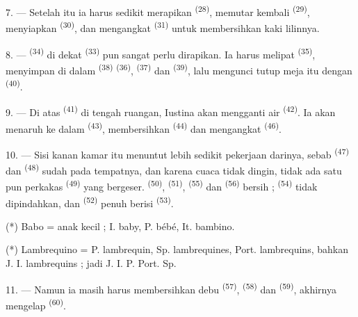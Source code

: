 7. --- Setelah itu ia harus sedikit merapikan 
\textsuperscript{(28)}, memutar kembali 
\textsuperscript{(29)}, menyiapkan 
\textsuperscript{(30)}, dan mengangkat 
\textsuperscript{(31)} untuk membersihkan kaki lilinnya.

\VUsaut{5.0mm}
\VUsaut{3.0mm}

8. ---  \textsuperscript{(34)} di dekat
 \textsuperscript{(33)} pun sangat perlu
dirapikan. Ia harus melipat 
\textsuperscript{(35)}, menyimpan di dalam 
\textsuperscript{(38)}  
\textsuperscript{(36)},  \textsuperscript{(37)} dan
 \textsuperscript{(39)}, lalu mengunci tutup meja itu
dengan  \textsuperscript{(40)}.

9. --- Di atas  \textsuperscript{(41)} di
tengah ruangan, Iustina akan mengganti air 
\textsuperscript{(42)}. Ia akan menaruh  ke dalam
 \textsuperscript{(43)}, membersihkan
 \textsuperscript{(44)} dan mengangkat
 \textsuperscript{(46)}.

10. --- Sisi kanan kamar itu menuntut lebih sedikit pekerjaan
darinya, sebab  \textsuperscript{(47)} dan
 \textsuperscript{(48)} sudah pada tempatnya, dan
karena cuaca tidak dingin, tidak ada satu pun perkakas
 \textsuperscript{(49)} yang bergeser.
 \textsuperscript{(50)}, 
\textsuperscript{(51)},  \textsuperscript{(55)}
dan  \textsuperscript{(56)} bersih ;  \textsuperscript{(54)} tidak dipindahkan, dan 
\textsuperscript{(52)} penuh berisi 
\textsuperscript{(53)}.

(*) Babo = anak kecil ; I. baby, P. bébé, It. bambino.

(*) Lambrequino = P. lambrequin, Sp. lambrequines, Port. lambrequins,
bahkan J. I. lambrequins ; jadi J. I. P. Port. Sp.

11. --- Namun ia masih harus membersihkan debu 
\textsuperscript{(57)}, 
\textsuperscript{(58)} dan 
\textsuperscript{(59)}, akhirnya mengelap 
\textsuperscript{(60)}.

